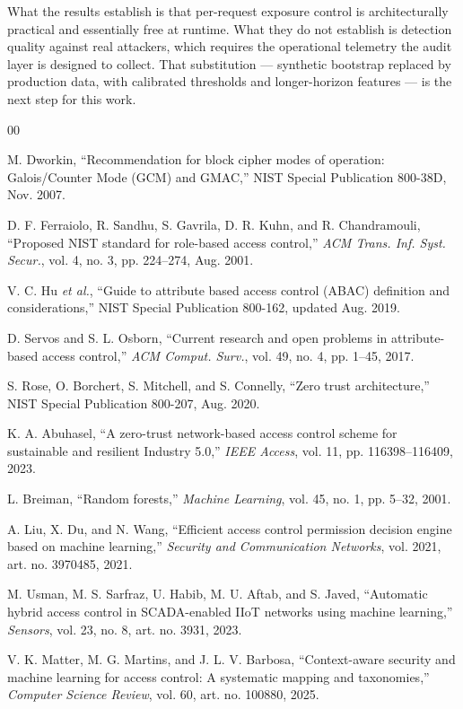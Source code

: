 \documentclass[a4paper,conference]{IEEEtran}
\begin{document}
What the results establish is that per-request exposure control is architecturally practical and
essentially free at runtime. What they do not establish is detection quality against real
attackers, which requires the operational telemetry the audit layer is designed to collect. That
substitution --- synthetic bootstrap replaced by production data, with calibrated thresholds and
longer-horizon features --- is the next step for this work.

\begin{thebibliography}{00}

 M. Dworkin, ``Recommendation for block cipher modes of operation: Galois/Counter
Mode (GCM) and GMAC,'' NIST Special Publication 800-38D, Nov. 2007.

 D. F. Ferraiolo, R. Sandhu, S. Gavrila, D. R. Kuhn, and R. Chandramouli,
``Proposed NIST standard for role-based access control,'' \emph{ACM Trans. Inf. Syst. Secur.},
vol. 4, no. 3, pp. 224--274, Aug. 2001.

 V. C. Hu \emph{et al.}, ``Guide to attribute based access control (ABAC)
definition and considerations,'' NIST Special Publication 800-162, updated Aug. 2019.

 D. Servos and S. L. Osborn, ``Current research and open problems in
attribute-based access control,'' \emph{ACM Comput. Surv.}, vol. 49, no. 4, pp. 1--45, 2017.

 S. Rose, O. Borchert, S. Mitchell, and S. Connelly, ``Zero trust architecture,''
NIST Special Publication 800-207, Aug. 2020.

 K. A. Abuhasel, ``A zero-trust network-based access control scheme for sustainable
and resilient Industry 5.0,'' \emph{IEEE Access}, vol. 11, pp. 116398--116409, 2023.

 L. Breiman, ``Random forests,'' \emph{Machine Learning}, vol. 45, no. 1, pp. 5--32,
2001.

 A. Liu, X. Du, and N. Wang, ``Efficient access control permission decision
engine based on machine learning,'' \emph{Security and Communication Networks}, vol. 2021,
art. no. 3970485, 2021.

 M. Usman, M. S. Sarfraz, U. Habib, M. U. Aftab, and S. Javed, ``Automatic hybrid
access control in SCADA-enabled IIoT networks using machine learning,'' \emph{Sensors}, vol. 23,
no. 8, art. no. 3931, 2023.

 V. K. Matter, M. G. Martins, and J. L. V. Barbosa, ``Context-aware security and
machine learning for access control: A systematic mapping and taxonomies,'' \emph{Computer
Science Review}, vol. 60, art. no. 100880, 2025.


\end{thebibliography}
\end{document}
